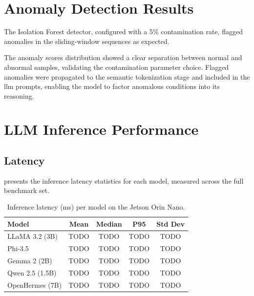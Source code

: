 \documentclass[12pt,a4paper,oneside]{report}
\begin{document}
\section{Anomaly Detection Results}
\label{sec:res-anomaly}

The Isolation Forest detector, configured with a 5\% contamination rate, flagged anomalies in the sliding-window sequences as expected.


The anomaly scores distribution showed a clear separation between normal and abnormal samples, validating the contamination parameter choice. Flagged anomalies were propagated to the semantic tokenization stage and included in the \gls{llm} prompts, enabling the model to factor anomalous conditions into its reasoning.


\section{LLM Inference Performance}
\label{sec:res-llm}

\subsection{Latency}

 presents the inference latency statistics for each model, measured across the full benchmark set.

\begin{table}[htbp]
\caption{Inference latency (ms) per model on the Jetson Orin Nano.}
\label{tab:llm-latency}
\centering
\begin{tabular}{lcccc}
\toprule
\textbf{Model} & \textbf{Mean} & \textbf{Median} & \textbf{P95} & \textbf{Std Dev} \\
\midrule
LLaMA 3.2 (3B)   & TODO & TODO & TODO & TODO \\
Phi-3.5           & TODO & TODO & TODO & TODO \\
Gemma 2 (2B)      & TODO & TODO & TODO & TODO \\
Qwen 2.5 (1.5B)   & TODO & TODO & TODO & TODO \\
OpenHermes (7B)   & TODO & TODO & TODO & TODO \\
\bottomrule
\end{tabular}
\end{table}
\end{document}
